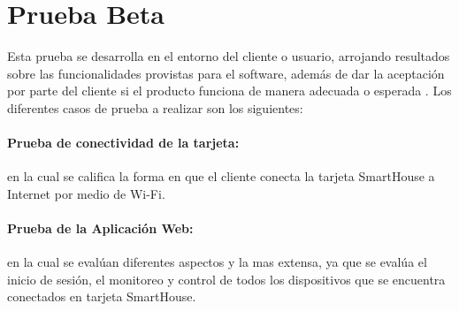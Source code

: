 \section{Prueba Beta}

Esta prueba se desarrolla en el entorno del cliente o usuario, arrojando resultados sobre las funcionalidades provistas para el software, además de dar la aceptación por parte del cliente si el producto funciona de manera adecuada o esperada \cite{PB}. Los diferentes casos de prueba a realizar son los siguientes:

\paragraph{Prueba de conectividad de la tarjeta:} en la cual se califica la forma en que el cliente conecta la tarjeta SmartHouse a Internet por medio de Wi-Fi.

\paragraph{Prueba de la Aplicación Web:} en la cual se evalúan diferentes aspectos y la mas extensa, ya que se evalúa el inicio de sesión, el monitoreo y control de todos los dispositivos que se encuentra conectados en tarjeta SmartHouse.
